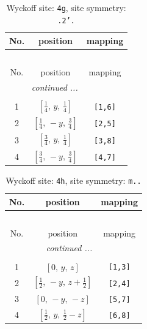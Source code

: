 \documentclass[fleqn,8pt]{jsarticle}
\begin{document}
\renewcommand{\arraystretch}{1.2}
\begin{longtable}{ccc}
\caption{Wyckoff site: {\tt 4g}, site symmetry: {\tt .2'.}}
 \\
 \hline \hline
No. & position & mapping \\ \hline \endfirsthead

\multicolumn{2}{l}{\tablename\ \thetable{}} \\
 \hline \hline
No. & position & mapping \\ \hline \endhead

 \hline \hline
\multicolumn{2}{r}{\footnotesize\it continued ...} \\ \endfoot

 \hline \hline
\multicolumn{2}{r}{} \\ \endlastfoot

1 & $\left[ \frac{1}{4},\, y,\, \frac{1}{4} \right]$ & {\tt [1,6]} \\ \hline
2 & $\left[ \frac{1}{4},\, - y,\, \frac{3}{4} \right]$ & {\tt [2,5]} \\ \hline
3 & $\left[ \frac{3}{4},\, y,\, \frac{1}{4} \right]$ & {\tt [3,8]} \\ \hline
4 & $\left[ \frac{3}{4},\, - y,\, \frac{3}{4} \right]$ & {\tt [4,7]} \\
\end{longtable}
\renewcommand{\arraystretch}{1.2}
\begin{longtable}{ccc}
\caption{Wyckoff site: {\tt 4h}, site symmetry: {\tt m..}}
 \\
 \hline \hline
No. & position & mapping \\ \hline \endfirsthead

\multicolumn{2}{l}{\tablename\ \thetable{}} \\
 \hline \hline
No. & position & mapping \\ \hline \endhead

 \hline \hline
\multicolumn{2}{r}{\footnotesize\it continued ...} \\ \endfoot

 \hline \hline
\multicolumn{2}{r}{} \\ \endlastfoot

1 & $\left[ 0,\, y,\, z \right]$ & {\tt [1,3]} \\ \hline
2 & $\left[ \frac{1}{2},\, - y,\, z + \frac{1}{2} \right]$ & {\tt [2,4]} \\ \hline
3 & $\left[ 0,\, - y,\, - z \right]$ & {\tt [5,7]} \\ \hline
4 & $\left[ \frac{1}{2},\, y,\, \frac{1}{2} - z \right]$ & {\tt [6,8]} \\
\end{longtable}
\end{document}
